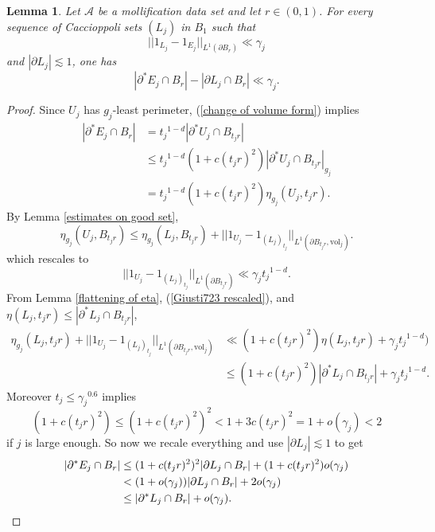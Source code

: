 \documentclass[reqno,12pt,letterpaper]{amsart}
\newcommand{\vol}{\mathrm{vol}}
\newtheorem{lemma}[theorem]{Lemma}
\theoremstyle{definition}
\numberwithin{equation}{section}
\begin{document}
\begin{lemma}\label{big mollify 2}
Let $\mathcal A$ be a mollification data set and let $r \in (0, 1)$.
For every sequence of Caccioppoli sets $(L_j)$ in $B_1$ such that
$$||1_{L_j} - 1_{E_j}||_{L^1(\partial B_r)} \ll \gamma_j$$
and $|\partial L_j| \lesssim 1$, one has
$$|\partial^* E_j \cap B_r| - |\partial L_j \cap B_r| \ll \gamma_j.$$
\end{lemma}
\begin{proof}
Since $U_j$ has $g_j$-least perimeter, (\ref{change of volume form}) implies
\begin{align*}
|\partial^* E_j \cap B_r| & = {t_j}^{1 - d}|\partial^* U_j \cap B_{t_jr}|\\
&\leq {t_j}^{1 - d} (1 + c(t_jr)^2) |\partial^* U_j \cap B_{t_jr}|_{g_j}\\
&= {t_j}^{1 - d} (1 + c(t_jr)^2) \eta_{g_j}(U_j, t_jr).
\end{align*}
By Lemma \ref{estimates on good set},
$$\eta_{g_j}(U_j, B_{t_jr}) \leq \eta_{g_j}(L_j, B_{t_jr}) + ||1_{U_j} - 1_{(L_j)_{t_j}}||_{L^1(\partial B_{t_jr}, \vol_j)}.$$
which rescales to
\begin{equation}\label{Giusti723 rescaled}
||1_{U_j} - 1_{(L_j)_{t_j}}||_{L^1(\partial B_{t_jr})} \ll \gamma_j {t_j}^{1 - d}.
\end{equation}
From Lemma \ref{flattening of eta}, (\ref{Giusti723 rescaled}), and $\eta(L_j, t_jr) \leq |\partial^* L_j \cap B_{t_jr}|$,
\begin{align*}
\eta_{g_j}(L_j, t_jr) + ||1_{U_j} - 1_{(L_j)_{t_j}}||_{L^1(\partial B_{t_jr}, \vol_j)} &\ll (1 + c(t_jr)^2) \eta(L_j, t_jr) + \gamma_j {t_j}^{1 - d})\\
&\leq (1 + c(t_jr)^2) |\partial^* L_j \cap B_{t_jr}| + \gamma_j {t_j}^{1 - d}.
\end{align*}
Moreover $t_j \leq {\gamma_j}^{0.6}$ implies
$$(1 + c(t_jr)^2) \leq (1 + c(t_jr)^2)^2 < 1 + 3c(t_jr)^2 = 1 + o(\gamma_j) < 2$$
if $j$ is large enough.
So now we recale everything and use $|\partial L_j| \lesssim 1$ to get
\begin{align*}
|\partial^* E_j \cap B_r| &\leq (1 + c(t_jr)^2)^2 |\partial L_j \cap B_r| + (1 + c(t_jr)^2) o(\gamma_j) \\
&< (1 + o(\gamma_j)) |\partial L_j \cap B_r| + 2o(\gamma_j)\\
&\leq |\partial^* L_j \cap B_r| + o(\gamma_j). \qedhere
\end{align*}
\end{proof}
\end{document}
